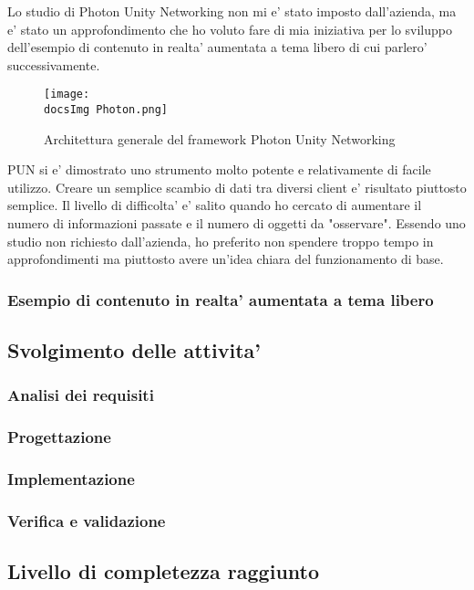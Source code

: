 Lo studio di Photon Unity Networking non mi e' stato imposto dall'azienda, ma e' stato un approfondimento che ho voluto fare di mia iniziativa per lo sviluppo dell'esempio di contenuto in realta' aumentata a tema libero di cui parlero' successivamente.

\begin{figure}[H]
	\centering
	\texttt{[image: \\docsImg Photon.png]}
	\caption{Architettura generale del framework Photon Unity Networking}
	\label{fig:Architettura generale del framework Photon Unity Networking}
\end{figure}

PUN si e' dimostrato uno strumento molto potente e relativamente di facile utilizzo. Creare un semplice scambio di dati tra diversi client e' risultato piuttosto semplice. Il livello di difficolta' e' salito quando ho cercato di aumentare il numero di informazioni passate e il numero di oggetti da "osservare". Essendo uno studio non richiesto dall'azienda, ho preferito non spendere troppo tempo in approfondimenti ma piuttosto avere un'idea chiara del funzionamento di base.

\subsubsection{Esempio di contenuto in realta' aumentata a tema libero}

\subsection{Svolgimento delle attivita'}
\subsubsection{Analisi dei requisiti}
\subsubsection{Progettazione}
\subsubsection{Implementazione}
\subsubsection{Verifica e validazione}

\subsection{Livello di completezza raggiunto}